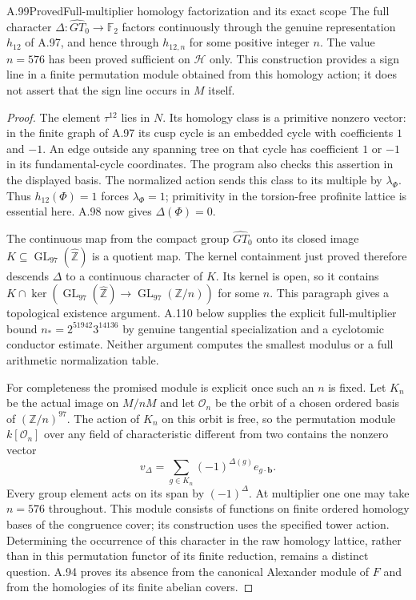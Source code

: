 \begin{statement}{A.99}{Proved}{Full-multiplier homology factorization and its exact scope}
The full character $\Delta:\widehat{GT}_0\to\mathbb F_2$
factors continuously through the genuine representation
$h_{12}$ of A.97, and hence through $h_{12,n}$ for some positive
integer $n$.  The value $n=576$ has been proved sufficient on
$\mathcal H$ only.  This construction provides a sign line in
a finite permutation module obtained from this homology action;
it does not assert that the sign line occurs in $M$ itself.
\end{statement}
\begin{proof}
The element $\tau^{12}$ lies in $N$. Its homology class is a
primitive nonzero vector: in the finite graph of A.97 its
cusp cycle is an embedded cycle with coefficients $1$ and
$-1$. An edge outside any spanning tree on that cycle has
coefficient $1$ or $-1$ in its fundamental-cycle coordinates.
The program also checks this assertion in the displayed basis.
The normalized action sends this class to its multiple by
$\lambda_\Phi$. Thus $h_{12}(\Phi)=1$ forces
$\lambda_\Phi=1$; primitivity in the torsion-free profinite
lattice is essential here. A.98 now gives $\Delta(\Phi)=0$.

The continuous map from the compact group $\widehat{GT}_0$
onto its closed image $K\subseteq\operatorname{GL}_{97}
(\widehat{\mathbb Z})$ is a quotient map. The kernel
containment just proved therefore descends $\Delta$ to a
continuous character of $K$. Its kernel is open, so it
contains $K\cap\ker(\operatorname{GL}_{97}
(\widehat{\mathbb Z})\to\operatorname{GL}_{97}
(\mathbb Z/n))$ for some $n$.
This paragraph gives a topological existence argument.
A.110 below supplies the explicit full-multiplier bound
$n_*=2^{51942}3^{14136}$ by genuine tangential specialization
and a cyclotomic conductor estimate. Neither argument computes
the smallest modulus or a full arithmetic normalization table.

For completeness the promised module is explicit once such an
$n$ is fixed. Let $K_n$ be the actual image on $M/nM$ and let
$\mathcal O_n$ be the orbit of a chosen ordered basis of
$(\mathbb Z/n)^{97}$.  The action of $K_n$ on this orbit is
free, so the permutation module $k[\mathcal O_n]$ over any
field of characteristic different from two contains the
nonzero vector
\[
 v_\Delta=\sum_{g\in K_n}(-1)^{\Delta(g)}
                   e_{g\cdot\mathbf b}.
\]
Every group element acts on its span by $(-1)^\Delta$.
At multiplier one one may take $n=576$ throughout.
This module consists of functions on finite ordered homology
bases of the congruence cover; its construction uses the
specified tower action.  Determining the occurrence of this
character in the raw homology lattice, rather than in this
permutation functor of its finite reduction, remains a distinct
question.  A.94 proves its absence from the canonical Alexander
module of $F$ and from the homologies of its finite abelian covers.
\end{proof}

